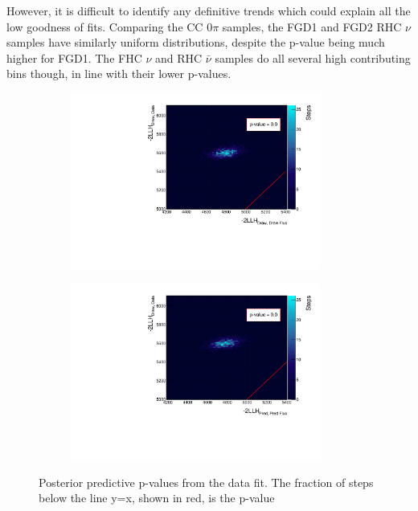 However, it is difficult to identify any definitive trends which could explain all the low goodness of fits. Comparing the CC 0$\pi$ samples, the FGD1 and FGD2 RHC $\nu$ samples have similarly uniform distributions, despite the p-value being much higher for FGD1. The FHC $\nu$ and RHC $\bar{\nu}$ samples do all several high contributing bins though, in line with their lower p-values. 

\begin{figure}[!htbp]
\centering
\begin{subfigure}{.49\textwidth}
  \centering
	\includegraphics*[width=0.9\textwidth,clip]{figs/pval_}
\end{subfigure}
\begin{subfigure}{.49\textwidth}
  \centering
	\includegraphics*[width=0.9\textwidth,clip]{figs/pval2_}
\end{subfigure}
\caption{Posterior predictive p-values from the data fit. The fraction of steps below the line y=x, shown in red, is the p-value}\label{fig:pval}
\end{figure}

